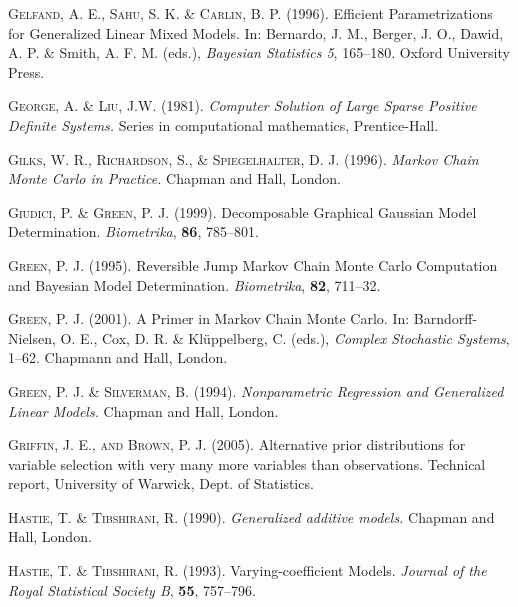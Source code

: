 \begin{thebibliography}{99}
 {\scshape Gelfand, A. E., Sahu, S. K. \& Carlin, B. P.} (1996).
 Efficient Parametrizations for Genera\-lized Linear Mixed Models.
 In: Bernardo, J. M., Berger, J. O., Dawid, A. P. \& Smith, A. F. M. (eds.),
 {\it Bayesian Statistics 5}, 165--180.
 Oxford University Press.

 {\scshape George, A. \& Liu, J.W.} (1981).
 {\it Computer Solution of Large Sparse Positive Definite Systems.}
 Series in computational mathematics, Prentice-Hall.

 {\scshape Gilks, W. R., Richardson, S., \& Spiegelhalter, D. J.} (1996).
 {\it Markov Chain Monte Carlo in Practice.}
 Chapman and Hall, London.

 {\scshape Giudici, P. \& Green, P. J.} (1999).
 Decomposable Graphical Gaussian Model Determination.
 {\it Biometrika}, {\bf 86}, 785--801.

 {\scshape Green, P. J.} (1995).
 Reversible Jump Markov Chain Monte Carlo Computation and Bayesian Model Determination.
 {\it Biometrika}, {\bf  82}, 711--32.

 {\scshape Green, P. J.} (2001).
 A Primer in Markov Chain Monte Carlo.
 In: Barndorff-Nielsen, O. E., Cox, D. R. \& Kl\"{u}ppelberg, C. (eds.),
 {\it Complex Stochastic Systems}, 1--62.
 Chapmann and Hall, London.

 {\scshape Green, P. J. \& Silverman, B.} (1994).
 {\it Nonparametric Regression and Generalized Linear Models.}
 Chapman and Hall, London.

 {\scshape Griffin, J. E., and Brown, P. J.} (2005). Alternative prior distributions
 for variable selection with very many more variables than observations. Technical
 report, University of Warwick, Dept. of Statistics.

 {\scshape Hastie, T. \& Tibshirani, R.} (1990).
 {\it Generalized additive models.}
 Chapman and Hall, London.

 {\scshape Hastie, T. \& Tibshirani, R.} (1993).
 Varying-coefficient Models.
 {\it Journal of the Royal Statistical Society B}, {\bf 55}, 757--796.


\end{thebibliography}
